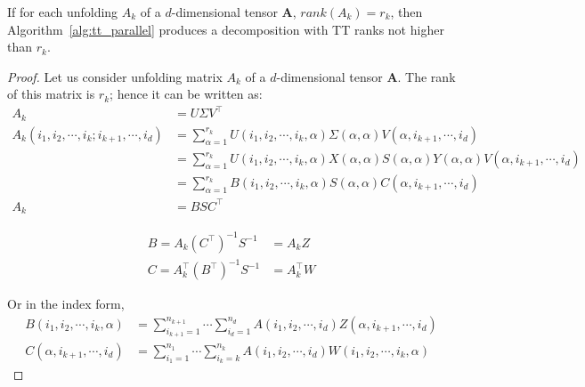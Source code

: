\documentclass[runningheads]{llncs}
\newcommand{\tensor}[1]{\cal\textbf{#1}\xspace}
\begin{document}
\begin{theorem}
	If for each unfolding $A_k$ of a $d$-dimensional tensor \tensor{A}, $rank(A_k)=r_k$, then Algorithm~\ref{alg:tt_parallel} produces a decomposition with TT ranks not higher than $r_k$.
\end{theorem}
\begin{proof}
	Let us consider unfolding matrix $A_k$ of a $d$-dimensional tensor \tensor{A}. The rank of this matrix is $r_k$; hence it can be written as:
	\begin{align*}
	A_k &= U \Sigma V^\intercal\\
	A_k(i_1,i_2,\cdots,i_k;i_{k+1},\cdots, i_d) &= \sum_{\alpha=1}^{r_k} U(i_1,i_2,\cdots,i_k, \alpha)\Sigma(\alpha, \alpha)V(\alpha,i_{k+1},\cdots, i_d)\\
	&= \sum_{\alpha=1}^{r_k} U(i_1,i_2,\cdots,i_k, \alpha)X(\alpha, \alpha)S(\alpha, \alpha)Y(\alpha, \alpha)V(\alpha,i_{k+1},\cdots, i_d)\\
	&= \sum_{\alpha=1}^{r_k} B(i_1,i_2,\cdots,i_k, \alpha)S(\alpha, \alpha)C(\alpha,i_{k+1},\cdots, i_d)\\
	A_k &= BSC^\intercal
	\end{align*}	

	\begin{align*}
B = A_k (C^\intercal)^{-1}S^{-1} &= A_kZ\\
C = A_k^\intercal (B^\intercal)^{-1}S^{-1} &= A_k^\intercal W
\end{align*}
	
	\noindent Or in the index form,
	\begin{align*}
	B(i_1,i_2,\cdots, i_k, \alpha) &= \sum_{i_{k+1}=1}^{n_{k+1}}\cdots\sum_{i_d=1}^{n_d} A(i_1, i_2, \cdots, i_d) Z(\alpha, i_{k+1},\cdots, i_d)\\
	C(\alpha, i_{k+1},\cdots, i_d) &= \sum_{i_1=1}^{n_1} \cdots \sum_{i_k=k}^{n_k} A(i_1, i_2, \cdots, i_d) W(i_1,i_2,\cdots, i_k, \alpha)
	\end{align*}
	

\end{proof}
\end{document}

